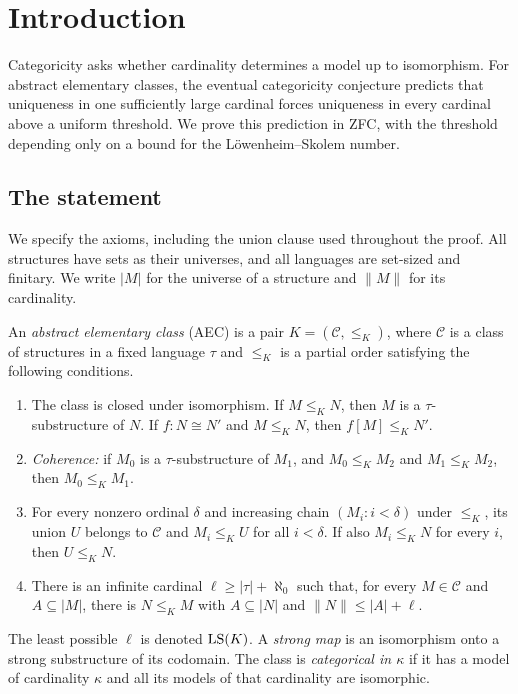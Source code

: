 \section{Introduction}\label{main:introduction}

Categoricity asks whether cardinality determines a model up to isomorphism.
For abstract elementary classes, the eventual categoricity conjecture predicts
that uniqueness in one sufficiently large cardinal forces uniqueness in every
cardinal above a uniform threshold. We prove this prediction in ZFC, with the
threshold depending only on a bound for the L\"owenheim--Skolem number.

\subsection{The statement}

We specify the axioms, including the union clause used throughout the proof.
All structures have sets as their universes, and all languages are set-sized
and finitary. We write $|M|$ for the universe of a structure and $\|M\|$ for
its cardinality.

\begin{definition}\label{main:aec}
An \emph{abstract elementary class} (AEC) is a pair $K=(\mathcal C,\le_K)$,
where $\mathcal C$ is a class of structures in a fixed language $\tau$ and
$\le_K$ is a partial order satisfying the following conditions.
\begin{enumerate}[label=\textup{(\arabic*)}]
\item The class is closed under isomorphism. If $M\le_K N$, then $M$ is a
$\tau$-substructure of $N$. If $f:N\cong N'$ and $M\le_K N$, then
$f[M]\le_K N'$.
\item \emph{Coherence:} if $M_0$ is a $\tau$-substructure of $M_1$, and
$M_0\le_K M_2$ and $M_1\le_K M_2$, then $M_0\le_K M_1$.
\item For every nonzero ordinal $\delta$ and increasing chain
$(M_i:i<\delta)$ under $\le_K$, its union $U$ belongs to $\mathcal C$ and
$M_i\le_K U$ for all $i<\delta$. If also $M_i\le_K N$ for every $i$, then
$U\le_K N$.
\item There is an infinite cardinal $\ell\ge |\tau|+\aleph_0$ such that,
for every $M\in\mathcal C$ and $A\subseteq |M|$, there is $N\le_K M$ with
$A\subseteq |N|$ and $\|N\|\le |A|+\ell$.
\end{enumerate}
The least possible $\ell$ is denoted $\operatorname{LS}(K)$. A \emph{strong map} is an
isomorphism onto a strong substructure of its codomain. The class is
\emph{categorical in $\kappa$} if it has a model of cardinality $\kappa$ and
all its models of that cardinality are isomorphic.
\end{definition}

